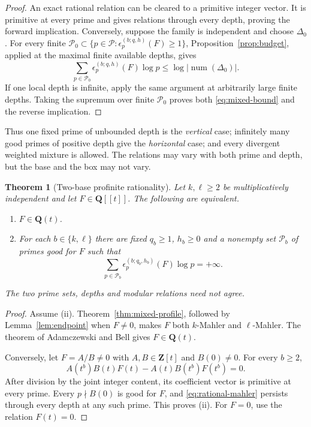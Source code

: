 \documentclass[11pt,reqno]{amsart}
\newtheorem{theorem}{Theorem}[section]
\theoremstyle{definition}
\theoremstyle{remark}
\newcommand{\Q}{\mathbf Q}
\newcommand{\Z}{\mathbf Z}
\begin{document}
\begin{proof}
An exact rational relation can be cleared to a primitive integer vector.  It
is primitive at every prime and gives relations through every depth, proving
the forward implication.  Conversely, suppose the family is independent
and choose $\Delta_0$.  For every finite
$\mathcal P_0\subset\{p\in\mathcal P:\epsilon_p^{(b;q,h)}(F)\geq1\}$,
Proposition~\ref{prop:budget}, applied at the maximal finite available
depths, gives
\[
 \sum_{p\in\mathcal P_0}\epsilon_p^{(b;q,h)}(F)\log p
 \leq\log|\operatorname{num}(\Delta_0)|.
\]
If one local depth is infinite, apply the same argument at arbitrarily large
finite depths.  Taking the supremum over finite $\mathcal P_0$ proves both
\eqref{eq:mixed-bound} and the reverse implication.
\end{proof}

Thus one fixed prime of unbounded depth is the \emph{vertical} case;
infinitely many good primes of positive depth give the \emph{horizontal}
case; and every divergent weighted mixture is allowed.  The relations may
vary with both prime and depth, but the base and the box may not vary.

\begin{theorem}[Two-base profinite rationality]\label{thm:two-base}
Let $k,\ell\geq2$ be multiplicatively independent and let
$F\in\Q[[t]]$.  The following are equivalent.
\begin{enumerate}[label=\textup{(\roman*)}]
\item $F\in\Q(t)$.
\item For each $b\in\{k,\ell\}$ there are fixed $q_b\geq1$, $h_b\geq0$
and a nonempty set $\mathcal P_b$ of primes good for $F$ such that
\[
 \sum_{p\in\mathcal P_b}
 \epsilon_p^{(b;q_b,h_b)}(F)\log p=+\infty.
\]
\end{enumerate}
The two prime sets, depths and modular relations need not agree.
\end{theorem}

\begin{proof}
Assume (ii).  Theorem~\ref{thm:mixed-profile}, followed by
Lemma~\ref{lem:endpoint} when $F\ne0$, makes $F$ both $k$-Mahler and
$\ell$-Mahler.  The theorem of Adamczewski and Bell
\cite[Theorem~1.3]{abtwobase} gives $F\in\Q(t)$.

Conversely, let $F=A/B\ne0$ with $A,B\in\Z[t]$ and $B(0)\ne0$.  For every
$b\geq2$,
\begin{equation}\label{eq:rational-mahler}
 A(t^b)B(t)F(t)-A(t)B(t^b)F(t^b)=0.
\end{equation}
After division by the joint integer content, its coefficient vector is
primitive at every prime.  Every $p\nmid B(0)$ is good for $F$, and
\eqref{eq:rational-mahler} persists through every depth at any such prime.
This proves (ii).  For $F=0$, use the relation $F(t)=0$.
\end{proof}
\end{document}
